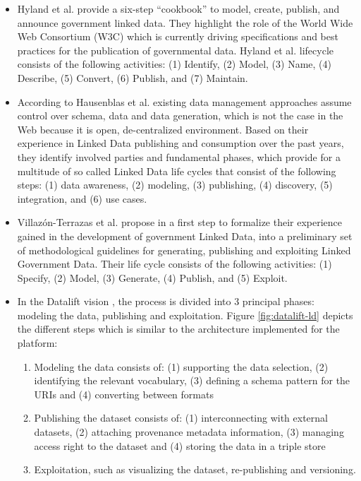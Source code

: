 \begin{itemize}
\item Hyland et al. \cite{bhyland11} provide a six-step ``cookbook'' to model, create, publish, and announce government linked data. They highlight the role of the World Wide Web Consortium (W3C) which is currently driving specifications and best practices for the publication of governmental data. Hyland et al. lifecycle consists of the following activities: (1) Identify, (2) Model, (3) Name, (4) Describe, (5) Convert, (6) Publish, and (7) Maintain.

\item According to Hausenblas et al. \cite{hausenblas12} existing data management approaches assume control over schema, data and data generation, which is not the case in the Web because it is open, de-centralized environment. Based on their experience in Linked Data publishing and consumption over the past years, they identify involved parties and fundamental phases, which provide for a multitude of so called Linked Data life cycles that consist of the following steps: (1) data awareness, (2) modeling, (3) publishing, (4) discovery, (5) integration, and (6) use cases.

\item Villaz\'{o}n-Terrazas et al. propose in \cite{bvillazon} a first step to formalize their experience gained in the development of government Linked Data, into a preliminary set of methodological guidelines for generating, publishing and exploiting Linked Government Data. Their life cycle consists of the following activities: (1) Specify, (2) Model, (3) Generate, (4) Publish, and (5) Exploit.

\item In the Datalift vision \cite{scharffe_2012}, the process is divided into 3 principal phases: modeling the data, publishing and exploitation. Figure \ref{fig:datalift-ld} depicts the different steps which is similar to the architecture implemented for the platform:
	\begin{enumerate}
	\item Modeling the data consists of: (1) supporting the data selection, (2) identifying the relevant vocabulary, (3) defining a schema pattern for the URIs and (4) converting between formats
	
	\item Publishing the dataset consists of: (1) interconnecting with external datasets, (2) attaching provenance metadata information, (3) managing access right to the dataset and (4) storing the data in a triple store
	
	\item  Exploitation, such as visualizing the dataset, re-publishing and versioning.
	
	\end{enumerate}

\end{itemize}

